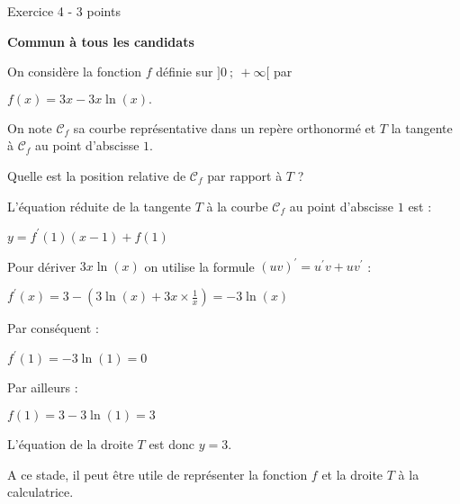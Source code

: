 
%
\begin{h2}Exercice 4 - 3 points\end{h2}
\textbf{Commun à tous les candidats}
\par
On considère la fonction $f$ définie sur $]0~;~ +\infty[$ par
\begin{center}$f(x) = 3x-3x\ln (x).$\end{center}
On note $\mathcal{C}_f$ sa courbe représentative dans un repère orthonormé et $T$ la tangente à $\mathcal{C}_f$ au point d'abscisse $1$.
\par
Quelle est la position relative de $\mathcal{C}_f$ par rapport à $T$ ?
\begin{corrige}


L'équation réduite de la tangente $T$ à la courbe $\mathcal{C}_f$ au point d'abscisse $1$ est :
\begin{center}$y=f^{\prime}(1)(x-1)+f(1)$\end{center}
Pour dériver $3x\ln(x)$ on utilise la formule $(uv)^{\prime}=u^{\prime}v+uv^{\prime}$ :
\par
$f^{\prime}(x)=3-\left(3\ln(x)+3x \times \frac{1}{x}\right)=-3\ln(x)$
\par
Par conséquent :
\par
$f^{\prime}(1)=-3\ln(1)=0$
\par
Par ailleurs :
\par
$f(1)=3-3\ln(1)=3$
\par
L'équation de la droite $T$ est donc $y=3$.
\par
A ce stade, il peut être utile de représenter la fonction $f$ et la droite $T$ à la calculatrice.

\begin{center}
\end{center}


\end{corrige}
